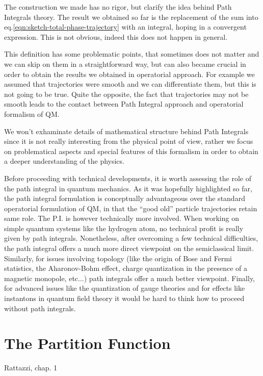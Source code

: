\documentclass[../main/main.tex]{subfiles}
\begin{document}
The construction we made has no rigor, but clarify the idea behind Path Integrals theory. The result we obtained so far is the replacement of the sum into eq.\eqref{eqn:sketch-total-phase-trajectory} with an integral, hoping in a convergent expression. This is not obvious, indeed this does not happen in general. 

This definition has some problematic points, that sometimes does not matter and we can skip on them in a straightforward way, but can also became crucial in order to obtain the results we obtained in operatorial approach. For example we assumed that trajectories were smooth and we can differentiate them, but this is not going to be true. Quite the opposite, the fact that trajectories may not be smooth leads to the contact between Path Integral approach and operatorial formalism of QM. 

We won't exhaminate details of mathematical structure behind Path Integrals since it is not really interesting from the physical point of view, rather we focus on problematical aspects and special features of this formalism in order to obtain a deeper understanding of the physics. 

Before proceeding with technical developments, it is worth assessing the role of the path integral in quantum mechanics. As it was hopefully highlighted so far, the path integral formulation is conceptually advantageous over the standard operatorial formulation of QM, in that the ``good old'' particle trajectories retain same role. The P.I. is however technically more involved. When working on simple quantum systems like the hydrogen atom, no technical profit is really given by path integrals. Nonetheless, after overcoming a few technical difficulties, the path integral offers a much more direct viewpoint on the semiclassical limit. Similarly, for issues involving topology (like the origin of Bose and Fermi statistics, the Aharonov-Bohm effect, charge quantization in the presence of a magnetic monopole, etc$\dots$) path integrals offer a much better viewpoint. Finally, for advanced issues like the quantization of gauge theories and for effects like instantons in quantum field theory it would be hard to think how to proceed without path integrals.

\section{The Partition Function}
\textsf{Rattazzi, chap. 1}\\
\end{document}
